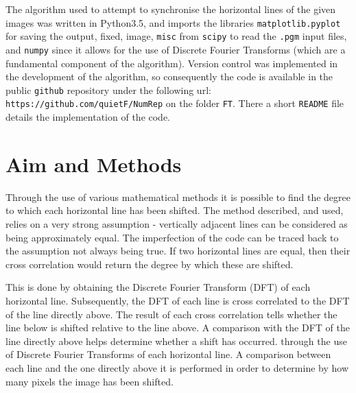 \documentclass[a4paper,10pt]{article}
\begin{document}
The algorithm used to attempt to synchronise the horizontal lines of the given images was written in Python3.5, and imports the libraries \texttt{matplotlib.pyplot} for saving the output, fixed, image, \texttt{misc} from \texttt{scipy} to read the \texttt{.pgm} input files, and \texttt{numpy} since it allows for the use of Discrete Fourier Transforms (which are a fundamental component of the algorithm). Version control was implemented in the development of the algorithm, so consequently the code is available in the public \texttt{github} repository under the following url: \texttt{https://github.com/quietF/NumRep} on the folder \texttt{FT}. There a short \texttt{README} file details the implementation of the code.

\section{Aim and Methods}

Through the use of various mathematical methods it is possible to find the degree to which each horizontal line has been shifted. The method described, and used, relies on a very strong assumption - vertically adjacent lines can be considered as being approximately equal. The imperfection of the code can be traced back to the assumption not always being true. If two horizontal lines are equal, then their cross correlation would return the degree by which these are shifted. 

This is done by obtaining the Discrete Fourier Transform (DFT) of each horizontal line. Subsequently, the DFT of each line is cross correlated to the DFT of the line directly above. The result of each cross correlation tells whether the line below is shifted relative to the line above.  A comparison with the DFT of the line directly above helps determine whether a shift has occurred.  through the use of Discrete Fourier Transforms of each horizontal line. A comparison between each line and the one directly above it is performed in order to determine by how many pixels the image has been shifted. 




\end{document}
